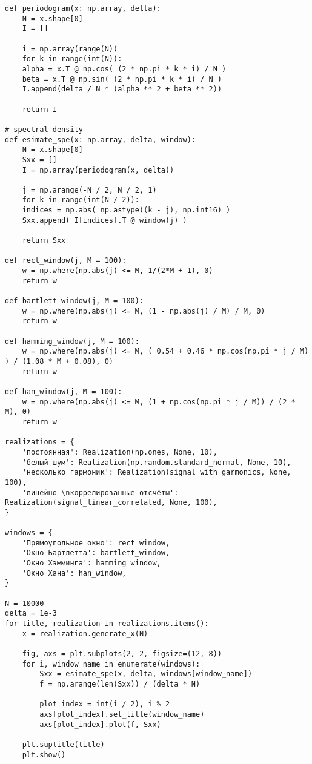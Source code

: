 {
	\vspace{-1.5em}
	\label{csd_plot_prog}
	\begin{verbatim}
def periodogram(x: np.array, delta):
	N = x.shape[0]
	I = []
	
	i = np.array(range(N))
	for k in range(int(N)):
	alpha = x.T @ np.cos( (2 * np.pi * k * i) / N )
	beta = x.T @ np.sin( (2 * np.pi * k * i) / N )
	I.append(delta / N * (alpha ** 2 + beta ** 2))
	
	return I

# spectral density
def esimate_spe(x: np.array, delta, window):
	N = x.shape[0]
	Sxx = []
	I = np.array(periodogram(x, delta))
	
	j = np.arange(-N / 2, N / 2, 1)
	for k in range(int(N / 2)):
	indices = np.abs( np.astype((k - j), np.int16) )
	Sxx.append( I[indices].T @ window(j) )
	
	return Sxx

def rect_window(j, M = 100):
	w = np.where(np.abs(j) <= M, 1/(2*M + 1), 0)
	return w

def bartlett_window(j, M = 100):
	w = np.where(np.abs(j) <= M, (1 - np.abs(j) / M) / M, 0)
	return w

def hamming_window(j, M = 100):
	w = np.where(np.abs(j) <= M, ( 0.54 + 0.46 * np.cos(np.pi * j / M) ) / (1.08 * M + 0.08), 0)
	return w

def han_window(j, M = 100):
	w = np.where(np.abs(j) <= M, (1 + np.cos(np.pi * j / M)) / (2 * M), 0)
	return w
	
realizations = {
	'постоянная': Realization(np.ones, None, 10),
	'белый шум': Realization(np.random.standard_normal, None, 10),
	'несколько гармоник': Realization(signal_with_garmonics, None, 100),
	'линейно \nкоррелированные отсчёты': Realization(signal_linear_correlated, None, 100),
}

windows = {
	'Прямоугольное окно': rect_window,
	'Окно Бартлетта': bartlett_window,
	'Окно Хэмминга': hamming_window,
	'Окно Хана': han_window,
}

N = 10000
delta = 1e-3
for title, realization in realizations.items():
	x = realization.generate_x(N)
	
	fig, axs = plt.subplots(2, 2, figsize=(12, 8))
	for i, window_name in enumerate(windows):
		Sxx = esimate_spe(x, delta, windows[window_name])
		f = np.arange(len(Sxx)) / (delta * N)
		
		plot_index = int(i / 2), i % 2
		axs[plot_index].set_title(window_name)
		axs[plot_index].plot(f, Sxx)
		
	plt.suptitle(title)
	plt.show()
	\end{verbatim}
}

